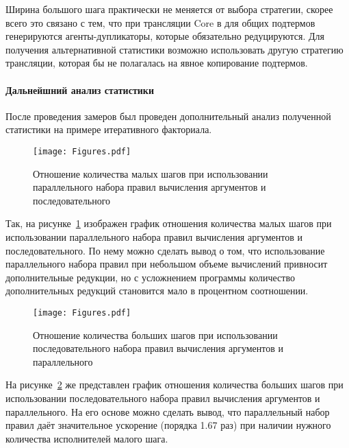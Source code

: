 Ширина большого шага практически не меняется от выбора стратегии, скорее всего это связано с тем, что при трансляции Core в \INs{} для общих подтермов генерируются агенты-дупликаторы, которые обязательно редуцируются.
Для получения альтернативной статистики возможно использовать другую стратегию трансляции, которая бы не полагалась на явное копирование подтермов.

\paragraph{Дальнейшний анализ статистики}

После проведения замеров был проведен дополнительный анализ полученной статистики на примере итеративного факториала.

\begin{figure}
    \begin{center}
        \texttt{[image: Figures.pdf]}
    \end{center}
    \caption{Отношение количества малых шагов при использовании параллельного набора правил вычисления аргументов и последовательного}
    \label{fig:fact_total}
\end{figure}

Так, на рисунке~\ref{fig:fact_total} изображен график отношения количества малых шагов при использовании параллельного набора правил вычисления аргументов и последовательного.
По нему можно сделать вывод о том, что использование параллельного набора правил при небольшом объеме вычислений привносит дополнительные редукции, но с усложнением программы количество дополнительных редукций становится мало в процентном соотношении.

\begin{figure}
    \begin{center}
        \texttt{[image: Figures.pdf]}
    \end{center}
    \caption{Отношение количества больших шагов при использовании последовательного набора правил вычисления аргументов и параллельного}
    \label{fig:fact_height}
\end{figure}

На рисунке~\ref{fig:fact_height} же представлен график отношения количества больших шагов при использовании последовательного набора правил вычисления аргументов и параллельного.
На его основе можно сделать вывод, что параллельный набор правил даёт значительное ускорение (порядка 1.67 раз) при наличии нужного количества исполнителей малого шага.

